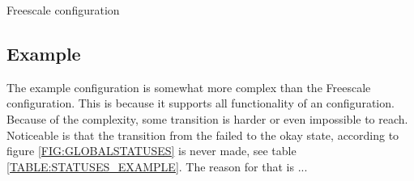 \begin{table}[!ht]
  \caption{Freescale configuration}
  \label{TABLE:STATUSES_FREESCALE}
  
\end{table}

\subsection{Example}
The example configuration is somewhat more complex than the Freescale
configuration. This is because it supports all functionality of an
configuration. Because of the complexity, some transition is harder or even
impossible to reach. Noticeable is that the transition from the failed to
the okay state, according to figure \ref{FIG:GLOBALSTATUSES} is never made, see
table \ref{TABLE:STATUSES_EXAMPLE}. The reason for that is ...

